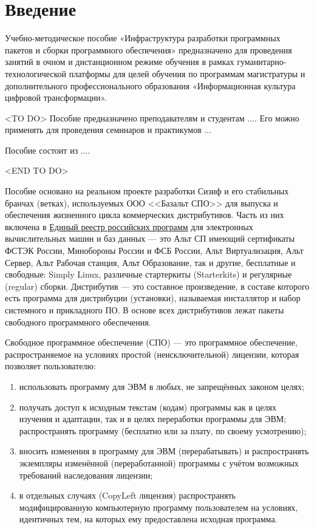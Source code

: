 \chapter*{Введение}

Учебно-методическое пособие «Инфраструктура разработки программных 
пакетов и сборки программного обеспечения» предназначено для проведения 
занятий в очном и дистанционном режиме обучения в рамках гуманитарно-технологической 
платформы для целей обучения по программам магистратуры и дополнительного 
профессионального образования «Информационная культура цифровой трансформации».

<TO DO>
Пособие предназначено преподавателям и студентам .... 
Его можно применять для проведения семинаров и практикумов ...

Пособие состоит из ....

<END TO DO>

Пособие основано на реальном проекте разработки Сизиф и его стабильных бранчах (ветках), 
используемых ООО <<Базальт СПО>> для выпуска и обеспечения жизненного цикла коммерческих 
дистрибутивов. Часть из них включена в \href{reestr.digital.gov.ru}{Единый реестр российских программ} для электронных 
вычислительных машин и баз данных --- это Альт СП имеющий сертификаты ФСТЭК России, 
Минобороны России и ФСБ России, Альт Виртуализация, Альт Сервер, Альт Рабочая станция, 
Альт Образование, так и другие, бесплатные и свободные: Simply Linux, различные стартеркиты 
(Starterkits) и регулярные (regular) сборки. Дистрибутив --- это составное произведение, 
в составе которого есть программа для дистрибуции (установки), называемая инсталлятор и 
набор системного и прикладного ПО. В основе всех дистрибутивов лежат пакеты свободного 
программного обеспечения.

Свободное программное обеспечение (СПО) --- это программное обеспечение, распространяемое 
на условиях простой (неисключительной) лицензии, которая позволяет пользователю:
\begin{enumerate}
    \item использовать программу для ЭВМ в любых, не запрещённых законом целях;
    \item получать доступ к исходным текстам (кодам) программы как в целях изучения и адаптации, 
    так и в целях переработки программы для ЭВМ; распространять программу (бесплатно или за плату, по своему усмотрению);
    \item вносить изменения в программу для ЭВМ (перерабатывать) и распространять экземпляры изменённой (переработанной) 
    программы с учётом возможных требований наследования лицензии;
    \item в отдельных случаях (CopyLeft лицензия) распространять модифицированную компьютерную программу пользователем 
    на условиях, идентичных тем, на которых ему предоставлена исходная программа.
\end{enumerate}

